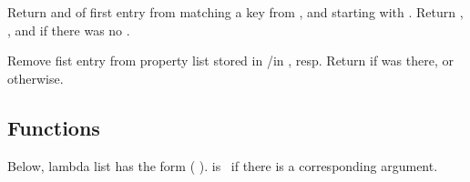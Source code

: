 \begin{LIST}{1cm}
  Return  and  of first entry from 
  matching a key from , and  starting with . Return \retval{\NIL},
  \retvalii{\NIL}, and  \retvaliii{\NIL} if there was no .

  Remove fist entry  from property list stored in
  /in , resp. Return \retval{\T} if 
  was there, or \retval{\NIL} otherwise.

\end{LIST}


\subsection{Functions}
\label{section:Functions}


Below, lambda list  has the form 
(
).  is \T\ if there is a corresponding argument.

